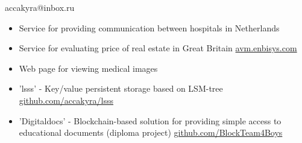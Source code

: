 \documentclass[]{cv-style}
\begin{document}

\begin{aside}
    \color{white} \LARGE accakyra@inbox.ru
\end{aside}

\vspace{7.9cm}



\vspace{0.7cm}


\Large{}

\begin{itemize}
    \item {\large {Service for providing communication between hospitals in Netherlands}}
    \item {\large {Service for evaluating price of real estate in Great Britain \url{avm.enbisys.com}}}
    \item {\large Web page for viewing medical images}
\end{itemize}

\small\makebox[0.2\linewidth][l]{\faCalendar\hspace{0.5em}{2018 November -- 2020 July}}

\vspace{0.7cm}


\begin{itemize}
    \item {\large {'lsss' - Key/value persistent storage based on LSM-tree \href{https://github.com/accakyra/lsss}{github.com/accakyra/lsss}}}
    \item {\large {'Digitaldocs' - Blockchain-based solution for providing simple access to educational documents
    \hfill \break
    (diploma project) \href{https://github.com/BlockTeam4Boys}{github.com/BlockTeam4Boys}}}
\end{itemize}

\vspace{0.5cm}


\vspace{0.7cm}



\vspace{0.7cm}
\end{document}
